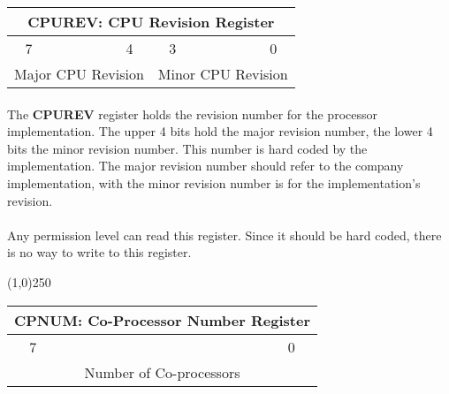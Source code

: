 \documentclass[letterpaper, 11pt]{article}
\begin{document}







\begin{center}
	\begin{tabular}{|cccc|cccc|}
		\multicolumn{8}{c}{\textbf{CPUREV}: CPU Revision Register} \\ \hline
		7 \hfill &\hfill & \hfill&\hfill4\hfill &\hfill3\hfill &\hfill &\hfill &\hfill0 \\ \hline
		\multicolumn{4}{|c|}{Major CPU Revision} & \multicolumn{4}{|c|}{ Minor CPU Revision}  \\ \hline
		
	\end{tabular}
\end{center}

\paragraph{} The \textbf{CPUREV} register holds the revision number for the processor
implementation. The upper 4 bits hold the major revision number, the lower 4 bits the 
minor revision number. This number is hard coded by the implementation. The
major revision number should refer to the company implementation, with the minor
revision number is for the implementation's revision.
\paragraph{} Any permission level can read this register. Since it should be hard coded,
there is no way to write to this register.

\begin{center}
	\line(1,0){250}
\end{center}
\vspace{0.2 cm}


\begin{center}
	\begin{tabular}{|cccccccc|}
		\multicolumn{8}{c}{\textbf{CPNUM}: Co-Processor Number Register} \\ \hline
		7 & \hfill  & \hfill & \hfill & \hfill & \hfill & \hfill &\hfill	0 \\ \hline
		\multicolumn{8}{|c|}{Number of Co-processors}   \\ \hline

	\end{tabular}
\end{center}
\end{document}
